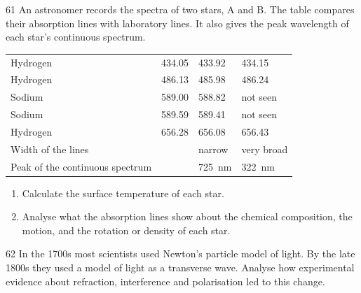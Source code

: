 \begin{practiceq}{6}{1}\label{pq:stars}
An astronomer records the spectra of two stars, A and B. The table compares their absorption
lines with laboratory lines. It also gives the peak wavelength of each star's continuous
spectrum.
\begin{center}\small
  \begin{tabular}{@{}L{54mm}C{27mm}C{27mm}C{27mm}@{}}
    \toprule
     &  &  &
      \\
    \midrule
    Hydrogen & 434.05 & 433.92 & 434.15\\
    Hydrogen & 486.13 & 485.98 & 486.24\\
    Sodium & 589.00 & 588.82 & not seen\\
    Sodium & 589.59 & 589.41 & not seen\\
    Hydrogen & 656.28 & 656.08 & 656.43\\
    \midrule
    Width of the lines & & narrow & very broad\\
    Peak of the continuous spectrum & & \qty{725}{nm} & \qty{322}{nm}\\
    \bottomrule
  \end{tabular}
\end{center}
\begin{enumerate}[label=(\alph*)]
  \item Calculate the surface temperature of each star. 
  \item Analyse what the absorption lines show about the chemical composition, the motion,
        and the rotation or density of each star. 
\end{enumerate}
\end{practiceq}

\begin{practiceq}{6}{2}\label{pq:models}
In the 1700s most scientists used Newton's particle model of light. By the late 1800s they used
a model of light as a transverse wave. Analyse how experimental evidence about refraction,
interference and polarisation led to this change.
\end{practiceq}

